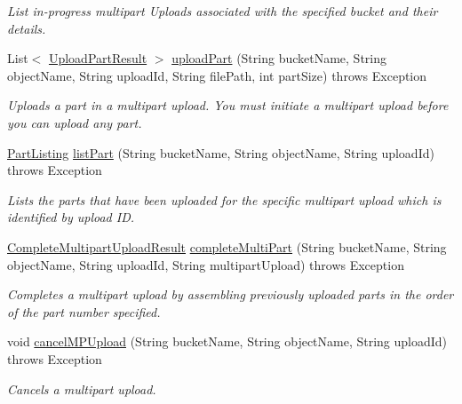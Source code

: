 \begin{DoxyCompactItemize}
\begin{DoxyCompactList}\small\item\em List in-\/progress multipart Uploads associated with the specified bucket and their details. \end{DoxyCompactList}\item 
List$<$ \hyperlink{classorg_1_1jcs_1_1dss_1_1main_1_1UploadPartResult}{Upload\+Part\+Result} $>$ \hyperlink{classorg_1_1jcs_1_1dss_1_1main_1_1DssConnection_a7ade5b9a69b86f1570d80ecf50625897}{upload\+Part} (String bucket\+Name, String object\+Name, String upload\+Id, String file\+Path, int part\+Size)  throws Exception 
\begin{DoxyCompactList}\small\item\em Uploads a part in a multipart upload. You must initiate a multipart upload before you can upload any part. \end{DoxyCompactList}\item 
\hyperlink{classorg_1_1jcs_1_1dss_1_1main_1_1PartListing}{Part\+Listing} \hyperlink{classorg_1_1jcs_1_1dss_1_1main_1_1DssConnection_a2deddf3532b4af7a262f42921ad0b828}{list\+Part} (String bucket\+Name, String object\+Name, String upload\+Id)  throws Exception 
\begin{DoxyCompactList}\small\item\em Lists the parts that have been uploaded for the specific multipart upload which is identified by upload ID. \end{DoxyCompactList}\item 
\hyperlink{classorg_1_1jcs_1_1dss_1_1main_1_1CompleteMultipartUploadResult}{Complete\+Multipart\+Upload\+Result} \hyperlink{classorg_1_1jcs_1_1dss_1_1main_1_1DssConnection_a680cb9129a891bb84c1ba86610850750}{complete\+Multi\+Part} (String bucket\+Name, String object\+Name, String upload\+Id, String multipart\+Upload)  throws Exception 
\begin{DoxyCompactList}\small\item\em Completes a multipart upload by assembling previously uploaded parts in the order of the part number specified. \end{DoxyCompactList}\item 
void \hyperlink{classorg_1_1jcs_1_1dss_1_1main_1_1DssConnection_a9f93c6721754267d929e93886b69134c}{cancel\+M\+P\+Upload} (String bucket\+Name, String object\+Name, String upload\+Id)  throws Exception 
\begin{DoxyCompactList}\small\item\em Cancels a multipart upload. \end{DoxyCompactList}\end{DoxyCompactItemize}


